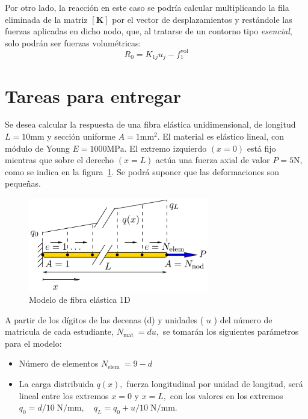  Por otro lado, la reacción en este caso se podría calcular multiplicando la fila eliminada de la matriz $[\mathbf{K}]$ por el vector de desplazamientos y restándole las fuerzas aplicadas en dicho nodo, que, al tratarse de un contorno tipo \emph{esencial}, solo podrán ser fuerzas volumétricas:
 $$
 R_0=K_{1j}u_j-f^{\text {vol}}_1
$$


\clearpage
\section{Tareas para entregar}
\label{sec:tareas}

Se desea calcular la respuesta de una fibra elástica unidimensional, de longitud \(L=10 \mathrm{mm}\)
y sección uniforme \(A=1 \mathrm{mm}^{2} .\) El material es elástico lineal, con módulo de Young \(E=1000 \mathrm{MPa}\).
El extremo izquierdo \((x=0)\) está fijo mientras que sobre el derecho \((x=L)\) actúa una fuerza
axial de valor \(P=5 \mathrm{N},\) como se indica en la figura~\ref{fig:esq}. Se podrá suponer que las deformaciones
son pequeñas.

\begin{figure}[!htp]
\centering
\includegraphics[width=0.7\textwidth]{figuras_1/esquema.pdf}
\caption{Modelo de fibra elástica 1D}
\label{fig:esq}
\end{figure}

A partir de los dígitos de las decenas (d) y unidades ( \(u\) ) del número de matricula de cada estudiante, \(N_{\text {mat }}=d u,\) se tomarán los siguientes parámetros para el modelo:
\begin{itemize}
\item Número de elementos \(N_{\text {elem }}=9-d\)
\item La carga distribuida \(q(x),\) fuerza longitudinal por unidad de longitud, será lineal entre los extremos \(x=0\) y \(x=L,\) con los valores en los extremos \(q_0=d / 10\; \mathrm{N} / \mathrm{mm}, \quad q_{L}=q_{0}+u / 10 \; \mathrm{N} / \mathrm{mm} \).
\end{itemize}

